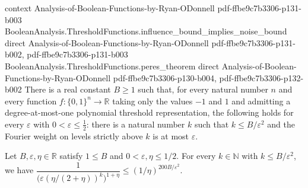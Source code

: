 \begin{lemma}
  {context}
  {Analysis-of-Boolean-Functions-by-Ryan-ODonnell}
  {pdf-ffbe9c7b3306-p131-b003}
\proofstep
  {BooleanAnalysis.ThresholdFunctions.influence_bound_implies_noise_bound}
  {direct}
  {Analysis-of-Boolean-Functions-by-Ryan-ODonnell}
  {pdf-ffbe9c7b3306-p131-b002,
    pdf-ffbe9c7b3306-p131-b003}
\proofstep
  {BooleanAnalysis.ThresholdFunctions.peres_theorem}
  {direct}
  {Analysis-of-Boolean-Functions-by-Ryan-ODonnell}
  {pdf-ffbe9c7b3306-p130-b004,
    pdf-ffbe9c7b3306-p132-b002}
There is a real constant $B\ge1$ such that, for every natural number $n$ and every
function $f:\{0,1\}^n\to\mathbb R$ taking only the values $-1$ and $1$ and admitting a
degree-at-most-one polynomial threshold representation, the following holds for every
$\varepsilon$ with $0<\varepsilon\le\tfrac12$: there is a natural number $k$ such that
$k\le B/\varepsilon^2$ and the Fourier weight on levels strictly above $k$ is at most
$\varepsilon$.
\end{lemma}

\begin{lemma}
\leanok
{}
Let $B,\varepsilon,\eta\in\mathbb R$ satisfy $1\le B$ and $0<\varepsilon,\eta\le 1/2$.
For every $k\in\mathbb N$ with $k\le B/\varepsilon^2$, we have
$\dfrac{1}{\bigl(\varepsilon(\eta/(2+\eta))^k\bigr)^{1+\eta}}\le
(1/\eta)^{200B/\varepsilon^2}$.
\end{lemma}

